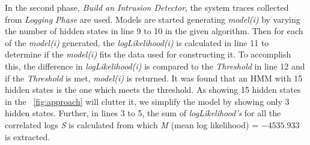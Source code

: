 \begin{table}
\centering
\caption{Slice of a faulty system trace obtained while an UAV was flying on a random route and infected by distance spoofing attack}
\label{tab:faultyCorrelationLog}
\end{table}
In the second phase, \textit{Build an Intrusion Detector}, the system traces collected from \textit{Logging Phase} are used. Models are started generating \textit{model(i)} by varying the number of hidden states in line 9 to 10 in the given algorithm. Then for each of the \textit{model(i)} generated, the \textit{logLikelihood(i)} is calculated in line 11 to determine if the \textit{model(i)} fits the data used for constructing it. To accomplish this, the difference in \textit{logLikelihood(i)} is compared to the \textit{Threshold} in line 12 and if the \textit{Threshold} is met, \textit{model(i)} is returned. It was found that an HMM with 15 hidden states is the one which meets the threshold. As showing 15 hidden states in the ~\autoref{fig:approach} will clutter it, we simplify the model by showing only 3 hidden states. Further, in lines 3 to 5, the sum of \textit{logLikelihood's} for all the correlated logs \textit{S} is calculated from which \textit{M} (mean log likelihood) = $-4535.933$ is extracted.

